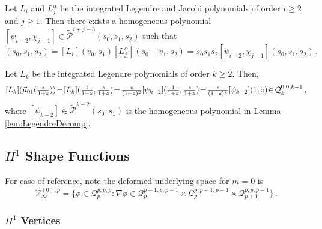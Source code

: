\begin{remark}
Let $L_i$ and $L_j^\alpha$ be the integrated Legendre and Jacobi polynomials of order $i\geq2$ and $j\geq1$. 
Then there exists a homogeneous polynomial $[\psi_{i-2},\chi_{j-1}]\in\tilde{\mathcal{P}}^{i+j-3}(s_0,s_1,s_2)$ such that
\begin{equation}
	[L_i,L_j^\alpha](s_0,s_1,s_2)=[L_i](s_0,s_1)[L_j^\alpha](s_0+s_1,s_2)=s_0s_1s_2[\psi_{i-2},\chi_{j-1}](s_0,s_1,s_2)\,.
	\label{eq:LiLjDecomp}
\end{equation}
\end{remark} 

\begin{remark}
Let $L_k$ be the integrated Legendre polynomials of order $k\geq2$. Then, 
\begin{equation}
		[L_k](\vec{\mu}_{01}(\szzz))\!=\![L_k](\szz,\szzz)\!=\!\frac{z}{(1+z)^2}[\psi_{k-2}](\szz,\szzz)
			\!=\!\frac{z}{(1+z)^k}[\psi_{k-2}](1,z)\!\in\!\mathcal{Q}_k^{0,0,k-1}\,,
	\label{eq:PyrphikZSpace}
\end{equation}
where $[\psi_{k-2}]\in\tilde{\mathcal{P}}^{k-2}(s_0,s_1)$ is the homogeneous polynomial in Lemma \ref{lem:LegendreDecomp}.
\end{remark} 


\subsection{\texorpdfstring{$H^1$}{H1} Shape Functions}

For ease of reference, note the deformed underlying space for $m=0$ is
\begin{equation*}
	\mathcal{V}_\infty^{(0),p}=\{\phi\!\in\!\mathcal{Q}_p^{p,p,p}:
		\nabla\phi\!\in\!\mathcal{Q}_p^{p-1,p,p-1}\!\times\!\mathcal{Q}_p^{p,p-1,p-1}\!\times\!\mathcal{Q}_{p+1}^{p,p,p-1}\}\,.
\end{equation*}

\subsubsection {\texorpdfstring{$H^1$}{H1} Vertices}

